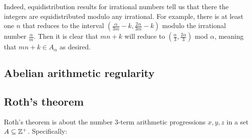 \documentclass{article}
\theoremstyle{definition}
\theoremstyle{remark}
\numberwithin{equation}{section}
\begin{document}
Indeed, equidistribution results for irrational numbers tell us that
there the integers are equidistributed modulo any irrational.  For
example, there is at least one $n$ that reduces to the interval
$\left(\frac{\alpha}{3m}-k,\frac{2\alpha}{3m}-k\right)$ modulo the
irrational number $\frac{\alpha}{m}$.  Then it is clear that $mn+k$
will reduce to $\left(\frac{\alpha}{3},\frac{2\alpha}{3}\right)$ mod
$\alpha$, meaning that $mn+k \in A_\alpha$ as desired.
{\color{red}

\subsection{Abelian arithmetic regularity}








}

\subsection{Roth's theorem}

Roth's theorem is about the number 3-term arithmetic progressions
$x, y, z$ in a set $A \subseteq \mathbb{Z}^+$.  Specifically: 
\end{document}
